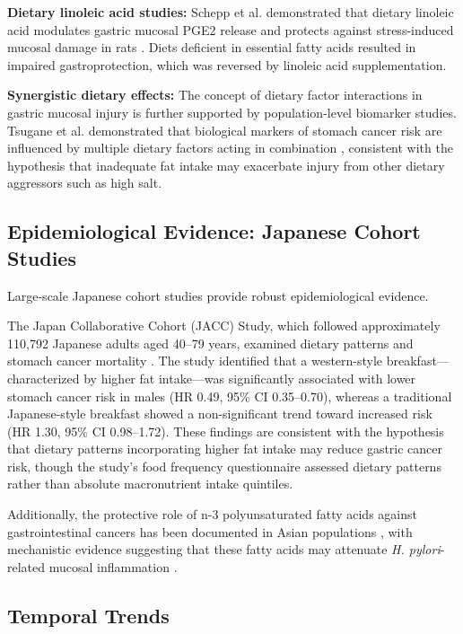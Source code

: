 \documentclass[review]{elsarticle}
\begin{document}
\textbf{Dietary linoleic acid studies:} Schepp et al. demonstrated that dietary linoleic acid modulates gastric mucosal PGE2 release and protects against stress-induced mucosal damage in rats \cite{schepp1988}. Diets deficient in essential fatty acids resulted in impaired gastroprotection, which was reversed by linoleic acid supplementation.

\textbf{Synergistic dietary effects:} The concept of dietary factor interactions in gastric mucosal injury is further supported by population-level biomarker studies. Tsugane et al. demonstrated that biological markers of stomach cancer risk are influenced by multiple dietary factors acting in combination \cite{tsugane1992}, consistent with the hypothesis that inadequate fat intake may exacerbate injury from other dietary aggressors such as high salt.

\subsection{Epidemiological Evidence: Japanese Cohort Studies}

Large-scale Japanese cohort studies provide robust epidemiological evidence.

The Japan Collaborative Cohort (JACC) Study, which followed approximately 110,792 Japanese adults aged 40--79 years, examined dietary patterns and stomach cancer mortality \cite{tokui2005}. The study identified that a western-style breakfast—characterized by higher fat intake—was significantly associated with lower stomach cancer risk in males (HR 0.49, 95\% CI 0.35--0.70), whereas a traditional Japanese-style breakfast showed a non-significant trend toward increased risk (HR 1.30, 95\% CI 0.98--1.72). These findings are consistent with the hypothesis that dietary patterns incorporating higher fat intake may reduce gastric cancer risk, though the study's food frequency questionnaire assessed dietary patterns rather than absolute macronutrient intake quintiles.

Additionally, the protective role of n-3 polyunsaturated fatty acids against gastrointestinal cancers has been documented in Asian populations \cite{calder2015}, with mechanistic evidence suggesting that these fatty acids may attenuate \textit{H. pylori}-related mucosal inflammation \cite{wallace2008}.

\subsection{Temporal Trends}
\end{document}
